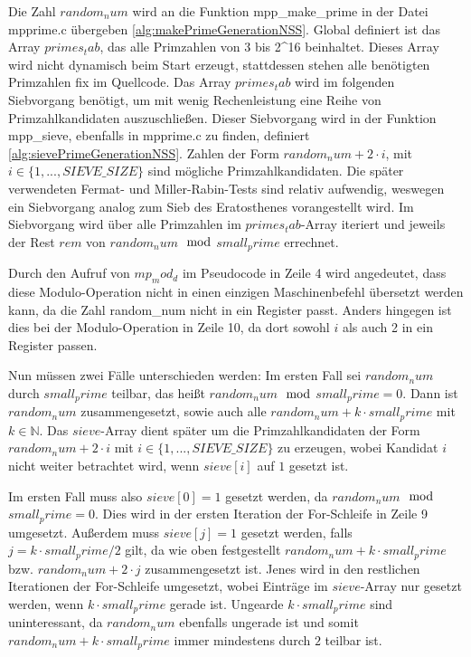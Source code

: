 Die Zahl $random_num$ wird an die Funktion mpp_make_prime in der Datei mpprime.c übergeben \ref{alg:makePrimeGenerationNSS}.
Global definiert ist das Array $primes_tab$, das alle Primzahlen von 3 bis 2^16 beinhaltet. Dieses Array wird nicht dynamisch beim Start erzeugt, stattdessen stehen alle benötigten Primzahlen fix im Quellcode. 
Das Array $primes_tab$ wird im folgenden Siebvorgang benötigt, um mit wenig Rechenleistung eine Reihe von Primzahlkandidaten auszuschließen.
Dieser Siebvorgang wird in der Funktion mpp_sieve, ebenfalls in mpprime.c zu finden, definiert \ref{alg:sievePrimeGenerationNSS}.
Zahlen der Form $random_num + 2 \cdot i$, mit $i \in \{1,...,SIEVE\_SIZE\}$ sind mögliche Primzahlkandidaten.
Die später verwendeten Fermat- und Miller-Rabin-Tests sind relativ aufwendig, weswegen ein Siebvorgang analog zum Sieb des Eratosthenes vorangestellt wird.
Im Siebvorgang wird über alle Primzahlen im $primes_tab$-Array iteriert und jeweils der Rest $rem$ von $random_num$$\mod$$small_prime$ errechnet.

Durch den Aufruf von $mp_mod_d$ im Pseudocode in Zeile 4 wird angedeutet, dass diese Modulo-Operation nicht in einen einzigen Maschinenbefehl übersetzt werden kann, da die Zahl random_num nicht in ein Register passt. Anders hingegen ist dies bei der Modulo-Operation in Zeile 10, da dort sowohl $i$ als auch 2 in ein Register passen.

Nun müssen zwei Fälle unterschieden werden:
Im ersten Fall sei $random_num$ durch $small_prime$ teilbar, das heißt $random_num$$\mod$$small_prime = 0$.
Dann ist $random_num$ zusammengesetzt, sowie auch alle $random_num + k \cdot small_prime$ mit $k \in \mathbb{N}$.
Das $sieve$-Array dient später um die Primzahlkandidaten der Form $random_num + 2 \cdot i$ mit $i \in \{1,...,SIEVE\_SIZE\}$ zu erzeugen, wobei Kandidat $i$ nicht weiter betrachtet wird, wenn $sieve[i]$ auf $1$ gesetzt ist.

Im ersten Fall muss also $sieve[0] = 1$ gesetzt werden, da $random_num$$\mod$$small_prime = 0$.
Dies wird in der ersten Iteration der For-Schleife in Zeile 9 umgesetzt.
Außerdem muss $sieve[j] = 1$ gesetzt werden, falls $j = k \cdot small_prime / 2$ gilt, da wie oben festgestellt $random_num + k \cdot small_prime$ bzw. $random_num + 2 \cdot j$ zusammengesetzt ist.
Jenes wird in den restlichen Iterationen der For-Schleife umgesetzt, wobei Einträge im $sieve$-Array nur gesetzt werden, wenn $k \cdot small_prime$ gerade ist.
Ungearde $k \cdot small_prime$ sind uninteressant, da $random_num$ ebenfalls ungerade ist und somit $random_num + k \cdot small_prime$ immer mindestens durch $2$ teilbar ist.

